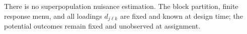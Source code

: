 There is no superpopulation nuisance estimation. The block partition, finite response menu, and all loadings \(d_{j\ell k}\) are fixed and known at design time; the potential outcomes remain fixed and unobserved at assignment.